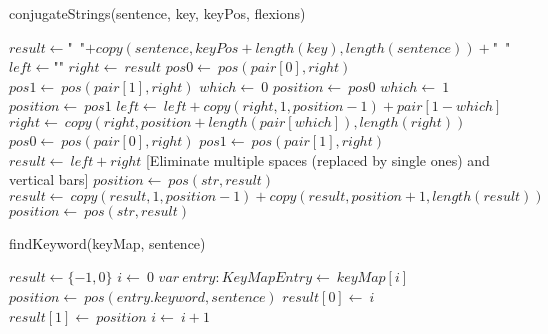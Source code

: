 \documentclass[a4paper,10pt]{article}
\begin{document}
\begin{algorithm}
\caption{conjugateStrings(sentence, key, keyPos, flexions)}
\begin{algorithmic}[5]

  \STATE \(result\gets\)"{}\ "{}\(+copy(sentence,keyPos+length(key),length(sentence))+\)"{}\ "{}\(\)
    \STATE \(left\gets\)"{}"{}\(\)
    \STATE \(right\gets\ result\)
    \STATE \(pos0\gets\ pos(pair[0],right)\)
    \STATE \(pos1\gets\ pos(pair[1],right)\)
      \STATE \(which\gets\ 0\)
      \STATE \(position\gets\ pos0\)
        \STATE \(which\gets\ 1\)
        \STATE \(position\gets\ pos1\)
      \ENDIF
      \STATE \(left\gets\ left+copy(right,1,position-1)+pair[1-which]\)
      \STATE \(right\gets\ copy(right,position+length(pair[which]),length(right))\)
      \STATE \(pos0\gets\ pos(pair[0],right)\)
      \STATE \(pos1\gets\ pos(pair[1],right)\)
    \ENDWHILE
    \STATE \(result\gets\ left+right\)
  \ENDFOR
  [Eliminate multiple spaces (replaced by single ones) and vertical bars]
    \STATE \(position\gets\ pos(str,result)\)
      \STATE \(result\gets\ copy(result,1,position-1)+copy(result,position+1,length(result))\)
      \STATE \(position\gets\ pos(str,result)\)
    \ENDWHILE
  \ENDFOR

\end{algorithmic}
\end{algorithm}


\begin{algorithm}
\caption{findKeyword(keyMap, sentence)}
\begin{algorithmic}[5]

\STATE {}
\STATE {}
\STATE {}
\STATE {}
\STATE {}
\STATE {}
  \STATE \(result\gets\{-1,0\}\)
  \STATE \(i\gets\ 0\)
    \STATE \(var\ entry:KeyMapEntry\gets\ keyMap[i]\)
    \STATE \(position\gets\ pos(entry.keyword,sentence)\)
      \STATE \(result[0]\gets\ i\)
      \STATE \(result[1]\gets\ position\)
    \ENDIF
    \STATE \(i\gets\ i+1\)
  \ENDWHILE

\end{algorithmic}
\end{algorithm}
\end{document}

